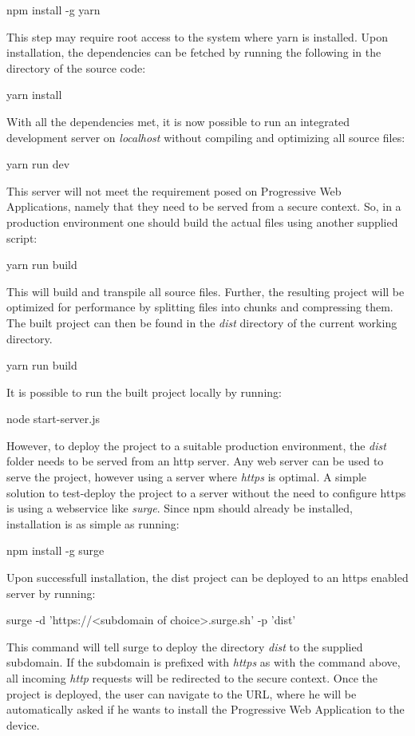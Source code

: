 \begin{framed}
npm install -g yarn
\end{framed}
This step may require root access to the system where yarn is installed. Upon installation, the dependencies can be fetched by running the following in the directory of the source code:
\begin{framed}
yarn install
\end{framed}
With all the dependencies met, it is now possible to run an integrated development server on \textit{localhost} without compiling and optimizing all source files:
\begin{framed}
yarn run dev\end{framed}
This server will not meet the requirement posed on Progressive Web Applications, namely that they need to be served from a secure context.
So, in a production environment one should build the actual files using another supplied script:
\begin{framed}
yarn run build\end{framed}
This will build and transpile all source files. Further, the resulting project will be optimized for performance by splitting files into chunks and compressing them. The built project can then be found in the \textit{dist} directory of the current working directory.
\begin{framed}
yarn run build
\end{framed}
It is possible to run the built project locally by running:
\begin{framed}
node start-server.js
\end{framed}
However, to deploy the project to a suitable production environment, the \textit{dist} folder needs to be served from an http server. Any web server can be used to serve the project, however using a server where \textit{https} is optimal. A simple solution to test-deploy the project to a server without the need to configure https is using a webservice like \textit{surge}. Since npm should already be installed, installation is as simple as running:
\begin{framed}
npm install -g surge
\end{framed}
Upon successfull installation, the dist project can be deployed to an https enabled server by running:
\begin{framed}
surge -d 'https://<subdomain of choice>.surge.sh' -p 'dist'
\end{framed}
This command will tell surge to deploy the directory \textit{dist} to the supplied subdomain. If the subdomain is prefixed with \textit{https} as with the command above, all incoming \textit{http} requests will be redirected to the secure context.
Once the project is deployed, the user can navigate to the URL, where he will be automatically asked if he wants to install the Progressive Web Application to the device.

